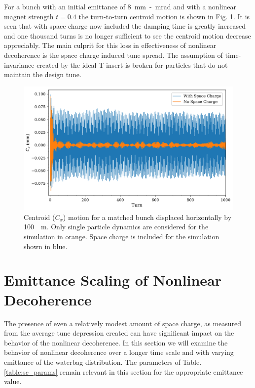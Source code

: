 \documentclass[aps,prstab,twocolumn, groupedaddress]{revtex4-1}
\begin{document}
For a bunch with an initial emittance of \SI{8}{mm-mrad} and with a nonlinear magnet 
strength $t=0.4$ the turn-to-turn centroid motion is shown in Fig. \ref{fig:sc_on-off}. It is 
seen that with space charge now included the damping time is greatly increased and one 
thousand turns is no longer sufficient to see the centroid motion decrease appreciably. 
The main culprit for this loss in effectiveness of nonlinear decoherence is the space 
charge induced tune spread. The assumption of time-invariance created by the ideal 
T-insert is broken for particles that do not maintain the design tune. 

\begin{figure}
	\includegraphics[width=\columnwidth]{sc-zc_centroid_motion_xoffset-100um.pdf}%
	\caption{\label{fig:sc_on-off} Centroid ($C_x$) motion for a matched bunch displaced 
		horizontally by \SI{100}{\mu m}. Only single particle dynamics are considered for the 
		simulation in orange. Space charge is included for the simulation shown in blue.}
\end{figure}

\section{Emittance Scaling of Nonlinear Decoherence}

The presence of even a relatively modest amount of space charge, as measured from the 
average tune depression created can have significant impact on the behavior of the 
nonlinear decoherence. In this section we will examine the behavior of nonlinear 
decoherence over a longer time scale and with varying emittance of the waterbag 
distribution. The parameters of Table. \ref{table:sc_params} remain relevant in this section 
for the appropriate emittance value. 
\end{document}
